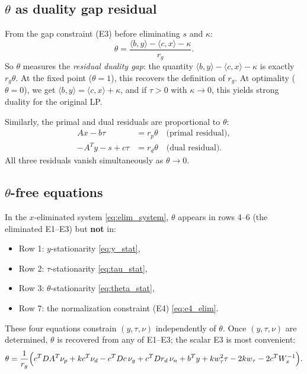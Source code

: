 \documentclass{article}
\newcommand{\ip}[2]{\langle #1, #2 \rangle}
\begin{document}
\subsection{$\theta$ as duality gap residual}

From the gap constraint (E3) before eliminating $s$ and $\kappa$:
\begin{equation} \label{eq:theta_gap}
  \theta = \frac{\ip{b}{y} - \ip{c}{x} - \kappa}{r_g}.
\end{equation}
So $\theta$ measures the \emph{residual duality gap}: the quantity $\ip{b}{y} - \ip{c}{x} - \kappa$ is exactly $r_g \theta$. At the fixed point ($\theta = 1$), this recovers the definition of $r_g$. At optimality ($\theta = 0$), we get $\ip{b}{y} = \ip{c}{x} + \kappa$, and if $\tau > 0$ with $\kappa \to 0$, this yields strong duality for the original LP.

Similarly, the primal and dual residuals are proportional to $\theta$:
\begin{align}
  Ax - b\tau &= r_p \theta \quad \text{(primal residual)}, \\
  -A^Ty - s + c\tau &= r_d \theta \quad \text{(dual residual)}.
\end{align}
All three residuals vanish simultaneously as $\theta \to 0$.

\subsection{$\theta$-free equations}

In the $x$-eliminated system \eqref{eq:elim_system}, $\theta$ appears in rows 4--6 (the eliminated E1--E3) but \textbf{not} in:
\begin{itemize}
  \item Row 1: $y$-stationarity \eqref{eq:y_stat},
  \item Row 2: $\tau$-stationarity \eqref{eq:tau_stat},
  \item Row 3: $\theta$-stationarity \eqref{eq:theta_stat},
  \item Row 7: the normalization constraint (E4) \eqref{eq:e4_elim}.
\end{itemize}
These four equations constrain $(y, \tau, \nu)$ independently of $\theta$. Once $(y, \tau, \nu)$ are determined, $\theta$ is recovered from any of E1--E3; the scalar E3 is most convenient:
\begin{equation} \label{eq:theta_recover}
  \theta = \frac{1}{r_g}\Bigl(c^TDA^T\nu_p + kc^T\nu_d - c^TDc\,\nu_g + c^TDr_d\,\nu_n + b^Ty + kw_\tau^2\tau - 2kw_\tau - 2c^TW_x^{-1}\Bigr).
\end{equation}
\end{document}
